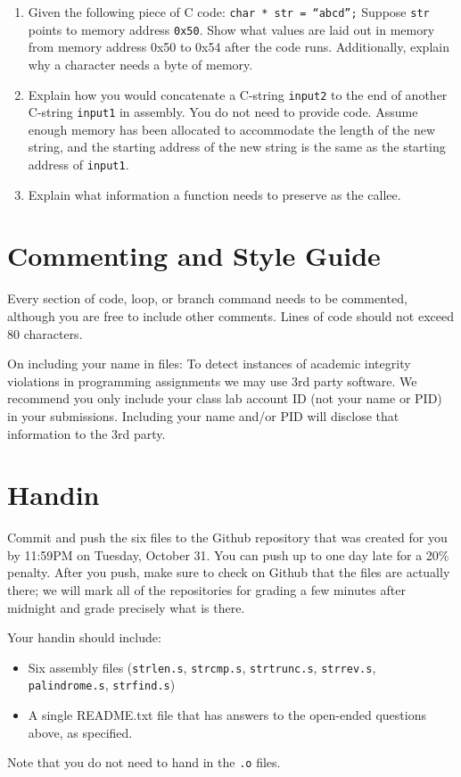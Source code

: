 \documentclass{article}
\begin{document}
\begin{enumerate}

\item Given the following piece of C code: {\tt char * str = ``abcd'';} \newline Suppose {\tt str} points to memory address {\tt 0x50}. Show what values are laid out in memory from memory address 0x50 to 0x54 after the code runs. Additionally, explain why a character needs a byte of memory.

\item Explain how you would concatenate a C-string {\tt input2} to the end of another C-string {\tt input1} in assembly. You do not need to provide code. Assume enough memory has been allocated to accommodate the length of the new string, and the starting address of the new string is the same as the starting address of {\tt input1}.

\item Explain what information a function needs to preserve as the callee.  

\end{enumerate}

\section{Commenting and Style Guide}

Every section of code, loop, or branch command needs to be commented, although
you are free to include other comments. Lines of code should not exceed 80
characters.

On including your name in files: To detect instances of academic integrity
violations in programming assignments we may use 3rd party software.  We
recommend you only include your class lab account ID (not your name or PID) in
your submissions.  Including your name and/or PID will disclose that
information to the 3rd party.

\section{Handin}

Commit and push the six files to the Github repository that was created
for you by 11:59PM on Tuesday, October 31. You can push up to one day late for
a 20\% penalty. After you push, make sure to check on Github that the files are
actually there; we will mark all of the repositories for grading a few minutes
after midnight and grade precisely what is there.

Your handin should include:

\begin{itemize}
\item Six assembly files ({\tt strlen.s}, {\tt strcmp.s}, {\tt strtrunc.s}, {\tt strrev.s}, {\tt palindrome.s}, {\tt strfind.s})
\item A single README.txt file that has answers to the open-ended questions
above, as specified.
\end{itemize}


Note that you do not need to hand in the {\tt .o} files.
\end{document}
